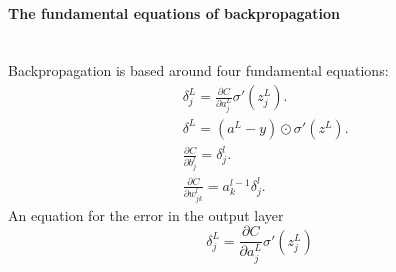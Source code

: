 \documentclass[10pt, a4paper, twocolumn]{article}
\newcommand{\myparagraph}[1]{\paragraph{#1}\mbox{}\\}
\begin{document}
%			
			\myparagraph{The fundamental equations of backpropagation}
			Backpropagation is based around four fundamental equations:
			\begin{align}
			&\delta_j^L = \frac{\partial {C}}{\partial{a_j^L}}\sigma'(z_j^L). \tag{BP1}\\
			&\delta^L = (a^L-y) \odot \sigma'(z^L). \tag{BP2}\\
			&\frac{\partial C}{\partial b^l_j} = \delta^l_j.\tag{BP3}\\
			&\frac{\partial C}{\partial w^l_{jk}} = a^{l-1}_k \delta^l_j. \tag{BP4}
			\end{align}
			An equation for the error in the output layer
			$$\delta_j^L = \frac{\partial {C}}{\partial{a_j^L}}\sigma'(z_j^L)$$
			
\end{document}
